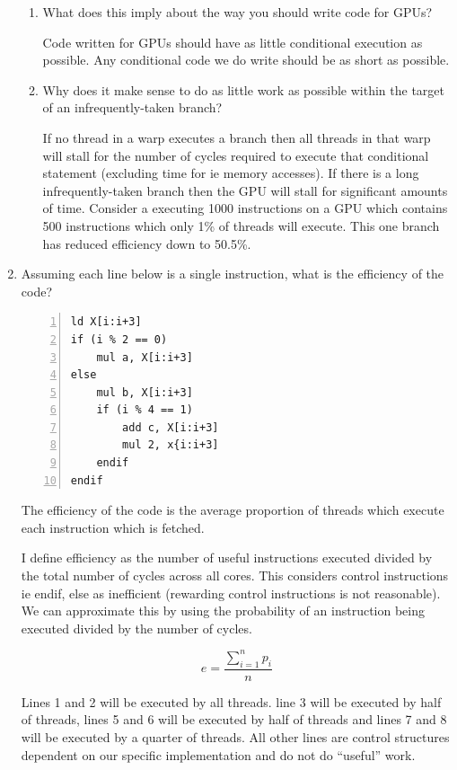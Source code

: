 \documentclass[10pt,\jkfside,a4paper]{article}
\begin{document}
\begin{enumerate}
\begin{enumerate}[label=(\alph*)]
\item What does this imply about the way you should write code for GPUs?

Code written for GPUs should have as little conditional execution as
possible. Any conditional code we do write should be as short as possible.

\item Why does it make sense to do as little work as possible within the
target of an infrequently-taken branch?

If no thread in a warp executes a branch then all threads in that warp will
stall for the number of cycles required to execute that conditional
statement (excluding time for ie memory accesses). If there is a long
infrequently-taken branch then the GPU will stall for significant amounts of
time. Consider a executing 1000 instructions on a GPU which contains 500
instructions which only 1\% of threads will execute. This one branch has
reduced efficiency down to 50.5\%.

\end{enumerate}

\item Assuming each line below is a single instruction, what is the
efficiency of the code?

\begin{lstlisting}[numbers=left]
ld X[i:i+3]
if (i % 2 == 0)
	mul a, X[i:i+3]
else
	mul b, X[i:i+3]
	if (i % 4 == 1)
		add c, X[i:i+3]
		mul 2, x{i:i+3]
	endif
endif
\end{lstlisting}

The efficiency of the code is the average proportion of threads which
execute each instruction which is fetched.

I define efficiency as the number of useful instructions executed divided by
the total number of cycles across all cores. This considers control
instructions ie endif, else as inefficient (rewarding control instructions
is not reasonable). We can approximate this by using the probability of an
instruction being executed divided by the number of cycles.

\[
e = \frac{\sum^{n}_{i=1} p_i}{n}
\]

Lines 1 and 2 will be executed by all threads. line 3 will be executed by
half of threads, lines 5 and 6 will be executed by half of threads and lines
7 and 8 will be executed by a quarter of threads. All other lines are
control structures dependent on our specific implementation and do not do
``useful'' work.


\end{enumerate}
\end{document}
